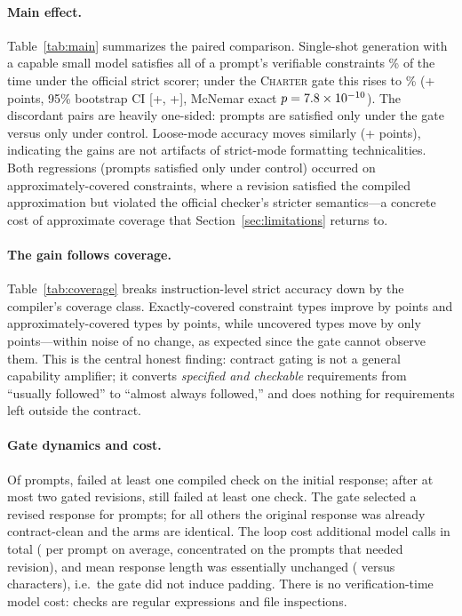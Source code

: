 \documentclass{article}
\begin{document}
\paragraph{Main effect.} Table~\ref{tab:main} summarizes the paired comparison.
Single-shot generation with a capable small model satisfies all of a prompt's
verifiable constraints \ControlPromptStrict\% of the time under the official
strict scorer; under the \textsc{Charter} gate this rises to
\TreatmentPromptStrict\% (+\DeltaPromptStrict{} points, 95\% bootstrap CI
[+\DeltaCILow, +\DeltaCIHigh], McNemar exact $p = 7.8 \times 10^{-10}$). The discordant
pairs are heavily one-sided: \DiscordantTreatOnly{} prompts are satisfied only
under the gate versus \DiscordantControlOnly{} only under control. Loose-mode
accuracy moves similarly (+\DeltaPromptLoose{} points), indicating the gains are
not artifacts of strict-mode formatting technicalities. Both regressions
(prompts satisfied only under control) occurred on approximately-covered
constraints, where a revision satisfied the compiled approximation but violated
the official checker's stricter semantics---a concrete cost of approximate
coverage that Section~\ref{sec:limitations} returns to.

\paragraph{The gain follows coverage.} Table~\ref{tab:coverage} breaks
instruction-level strict accuracy down by the compiler's coverage class.
Exactly-covered constraint types improve by \ExactDelta{} points and
approximately-covered types by \ApproxDelta{} points, while uncovered types move
by only \UncoveredDelta{} points---within noise of no change, as expected since
the gate cannot observe them. This is the central honest finding: contract
gating is not a general capability amplifier; it converts \emph{specified and
checkable} requirements from ``usually followed'' to ``almost always followed,''
and does nothing for requirements left outside the contract.

\paragraph{Gate dynamics and cost.} Of \NPromptsPaired{} prompts,
\GateInitialFail{} failed at least one compiled check on the initial response;
after at most two gated revisions, \GateFinalFail{} still failed at least one
check. The gate selected a revised response for \GateSelectedRevision{} prompts;
for all others the original response was already contract-clean and the arms are
identical. The loop cost \ExtraCalls{} additional model calls in total
(\MeanRevisions{} per prompt on average, concentrated on the
\PromptsWithRevision{} prompts that needed revision), and mean response length
was essentially unchanged (\MeanCharsControl{} versus \MeanCharsTreatment{}
characters), i.e.\ the gate did not induce padding. There is no
verification-time model cost: checks are regular expressions and file
inspections.
\end{document}
